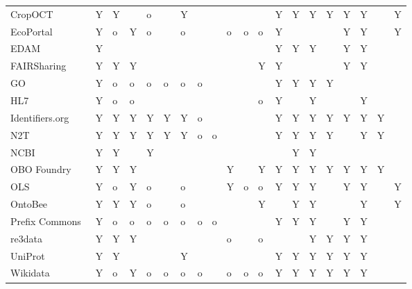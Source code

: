 \begin{table}
\begin{tabular}{llllllllllllllllllll}
CropOCT~\cite{Arnaud2020} & Y & Y &  & o &  & Y &  &  &  &  &  & Y & Y & Y & Y & Y & Y &  & Y \\
EcoPortal~\cite{Kechagioglou2021} & Y & o & Y & o &  & o &  &  & o & o & o & Y &  &  &  & Y & Y &  & Y \\
EDAM~\cite{Ison2013} & Y &  &  &  &  &  &  &  &  &  &  & Y & Y & Y &  & Y & Y &  &  \\
FAIRSharing~\cite{Sansone2019} & Y & Y & Y &  &  &  &  &  &  &  & Y & Y &  &  &  & Y & Y &  &  \\
GO~\cite{TheGeneOntologyConsortium2019} & Y & o & o & o & o & o & o &  &  &  &  & Y & Y & Y & Y &  &  &  &  \\
HL7~\cite{Bender2013} & Y & o & o &  &  &  &  &  &  &  & o & Y &  & Y &  &  & Y &  &  \\
Identifiers.org~\cite{Juty2012} & Y & Y & Y & Y & Y & Y & o &  &  &  &  & Y & Y & Y & Y & Y & Y & Y &  \\
N2T~\cite{Wimalaratne2018} & Y & Y & Y & Y & Y & Y & o & o &  &  &  & Y & Y & Y & Y &  & Y & Y &  \\
NCBI~\cite{Clark2016} & Y & Y &  & Y &  &  &  &  &  &  &  &  & Y & Y &  &  &  &  &  \\
OBO Foundry~\cite{Jackson2021} & Y & Y & Y &  &  &  &  &  & Y &  & Y & Y & Y & Y & Y & Y & Y & Y &  \\
OLS~\cite{Cote2006a} & Y & o & Y & o &  & o &  &  & Y & o & o & Y & Y & Y &  & Y & Y &  & Y \\
OntoBee~\cite{Ong2017} & Y & Y & Y & o &  & o &  &  &  &  & Y &  & Y & Y &  &  & Y &  & Y \\
Prefix Commons~\cite{prefixcommons} & Y & o & o & o & o & o & o & o &  &  &  & Y & Y & Y &  & Y & Y &  &  \\
re3data~\cite{Pampel2013} & Y & Y & Y &  &  &  &  &  & o &  & o &  &  & Y & Y & Y & Y &  &  \\
UniProt~\cite{Bateman2021} & Y & Y &  &  &  & Y &  &  &  &  &  & Y & Y & Y & Y & Y & Y &  &  \\
Wikidata~\cite{Waagmeester2020} & Y & o & Y & o & o & o & o &  & o & o & o & Y & Y & Y & Y & Y & Y &  &  \\
\bottomrule
\end{tabular}
\end{table}
